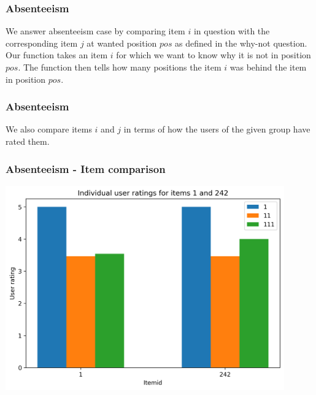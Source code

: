 \documentclass{beamer}
\begin{document}
\begin{frame}
  \frametitle{Absenteeism}
  We answer absenteeism case by comparing item $i$ in question with the corresponding 
  item $j$ at wanted position $pos$ as defined in the why-not question. Our function takes
  an item $i$ for which we want to know why it is not in position $pos$. The function then tells
  how many positions the item $i$ was behind the item in position $pos$. 
\end{frame}

\begin{frame}
  \frametitle{Absenteeism}
  We also compare items $i$ and $j$ in terms of how the users of the given group have rated
  them.
\end{frame}


\begin{frame}
  \frametitle{Absenteeism - Item comparison}
  \includegraphics[width=0.9\textwidth]{abs_ratings.png}
\end{frame}
\end{document}
